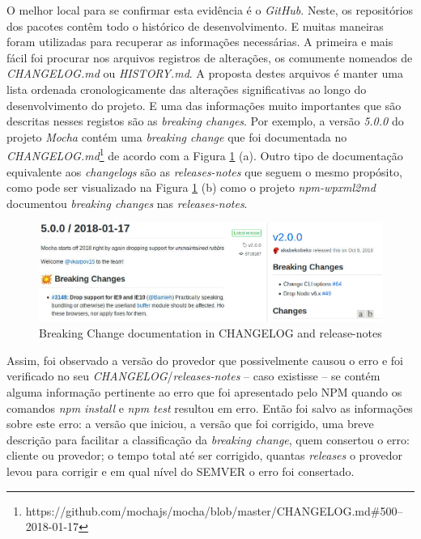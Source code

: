 O melhor local para se confirmar esta evidência é o \textit{GitHub}. Neste, os repositórios dos pacotes contêm todo o histórico de desenvolvimento. E muitas maneiras foram utilizadas para recuperar as informações necessárias. A primeira e mais fácil foi procurar nos arquivos registros de alterações, os comumente nomeados de \textit{CHANGELOG.md} ou \textit{HISTORY.md}. A proposta destes arquivos é manter uma lista ordenada cronologicamente das alterações significativas ao longo do desenvolvimento do projeto. E uma das informações muito importantes que são descritas nesses registos são as \textit{breaking changes}. Por exemplo, a versão \textit{5.0.0} do projeto \textit{Mocha} contém uma \textit{breaking change} que foi documentada no \textit{CHANGELOG.md}\footnote{https://github.com/mochajs/mocha/blob/master/CHANGELOG.md\#500--2018-01-17} de acordo com a Figura \ref{fig:bc_documentation} (a). Outro tipo de documentação equivalente aos \textit{changelogs} são as \textit{releases-notes} que seguem o mesmo propósito, como pode ser visualizado na Figura \ref{fig:bc_documentation} (b) como o projeto \textit{npm-wpxml2md} documentou \textit{breaking changes} nas \textit{releases-notes}.

\begin{figure}
    \centering
    \includegraphics[scale=0.45]{figuras/bc_documentation.jpeg}
    \caption{Breaking Change documentation in CHANGELOG and release-notes}
    \label{fig:bc_documentation}
\end{figure}{}

Assim, foi observado a versão do provedor que possivelmente causou o erro e foi verificado no seu \textit{CHANGELOG}/\textit{releases-notes} -- caso existisse -- se contém alguma informação pertinente ao erro que foi apresentado pelo \gls{NPM} quando os comandos \textit{npm install} e \textit{npm test} resultou em erro. Então foi salvo as informações sobre este erro: a versão que iniciou, a versão que foi corrigido, uma breve descrição para facilitar a classificação da \textit{breaking change}, quem consertou o erro: cliente ou provedor; o tempo total até ser corrigido, quantas \textit{releases} o provedor levou para corrigir e em qual nível do \gls{SEMVER} o erro foi consertado.

